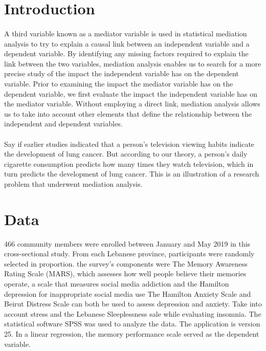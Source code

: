 \documentclass[12pt]{report}
\begin{document}
\section*{Introduction}
\paragraph{}
A third variable known as a mediator variable is used in statistical mediation analysis to try to explain a causal link between an independent variable and a dependent variable. By identifying any missing factors required to explain the link between the two variables, mediation analysis enables us to search for a more precise study of the impact the independent variable has on the dependent variable. Prior to examining the impact the mediator variable has on the dependent variable, we first evaluate the impact the independent variable has on the mediator variable. Without employing a direct link, mediation analysis allows us to take into account other elements that define the relationship between the independent and dependent variables.
\paragraph{}
Say if earlier studies indicated that a person's television viewing habits indicate the development of lung cancer. But according to our theory, a person's daily cigarette consumption predicts how many times they watch television, which in turn predicts the development of lung cancer. This is an illustration of a research problem that underwent mediation analysis. \cite{gao2021leisure}

\section*{Data}
466 community members were enrolled between January and May 2019 in this cross-sectional study.
From each Lebanese province, participants were randomly selected in proportion. the survey's components were
The Memory Awareness Rating Scale (MARS), which assesses how well people believe their memories operate,
a scale that measures social media addiction and the Hamilton depression for inappropriate social media use
The Hamilton Anxiety Scale and Beirut Distress Scale can both be used to assess depression and anxiety.
Take into account stress and the Lebanese Sleeplessness sale while evaluating insomnia. The statistical software SPSS was used to analyze the data.
The application is version 25. In a linear regression, the memory performance scale served as the dependent variable.
\end{document}
